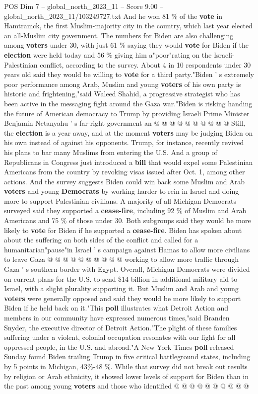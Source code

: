 \begin{textsample}{POS Dim 7 – global\_north\_2023\_11 – Score 9.00 – global\_north\_2023\_11/103249727.txt}
And he won 81 \% of the \textbf{vote} in Hamtramck, the first Muslim-majority city in the country, which last year elected an all-Muslim city government.
The numbers for Biden are also challenging among \textbf{voters} under 30, with just 61 \% saying they would \textbf{vote} for Biden if the \textbf{election} were held today and 56 \% giving him a"poor"rating on the Israeli-Palestinian conflict, according to the survey.
About 4 in 10 respondents under 30 years old said they would be willing to \textbf{vote} for a third party."Biden ' s extremely poor performance among Arab, Muslim and young \textbf{voters} of his own party is historic and frightening,"said Waleed Shahid, a progressive strategist who has been active in the messaging fight around the Gaza war."Biden is risking handing the future of American democracy to Trump by providing Israeli Prime Minister Benjamin Netanyahu ' s far-right government an @ @ @ @ @ @ @ @ @ @ Still, the \textbf{election} is a year away, and at the moment \textbf{voters} may be judging Biden on his own instead of against his opponents.
Trump, for instance, recently revived his plans to bar many Muslims from entering the U.S.
And a group of Republicans in Congress just introduced a \textbf{bill} that would expel some Palestinian Americans from the country by revoking visas issued after Oct. 1, among other actions.
And the survey suggests Biden could win back some Muslim and Arab \textbf{voters} and young \textbf{Democrats} by working harder to rein in Israel and doing more to support Palestinian civilians.
A majority of all Michigan Democrats surveyed said they supported a \textbf{cease-fire}, including 92 \% of Muslim and Arab Americans and 75 \% of those under 30.
Both subgroups said they would be more likely to \textbf{vote} for Biden if he supported a \textbf{cease-fire}.
Biden has spoken about about the suffering on both sides of the conflict and called for a humanitarian"pause"in Israel ' s campaign against Hamas to allow more civilians to leave Gaza @ @ @ @ @ @ @ @ @ @ working to allow more traffic through Gaza ' s southern border with Egypt.
Overall, Michigan Democrats were divided on current plans for the U.S. to send \$14 billion in additional military aid to Israel, with a slight plurality supporting it.
But Muslim and Arab and young \textbf{voters} were generally opposed and said they would be more likely to support Biden if he held back on it."This \textbf{poll} illustrates what Detroit Action and members in our community have expressed numerous times,"said Branden Snyder, the executive director of Detroit Action."The plight of these families suffering under a violent, colonial occupation resonates with our fight for all oppressed people, in the U.S. and abroad."A New York Times \textbf{poll} released Sunday found Biden trailing Trump in five critical battleground states, including by 5 points in Michigan, 43\%-48 \%.
While that survey did not break out results by religion or Arab ethnicity, it showed lower levels of support for Biden than in the past among young \textbf{voters} and those who identified @ @ @ @ @ @ @ @ @ @

\end{textsample}
